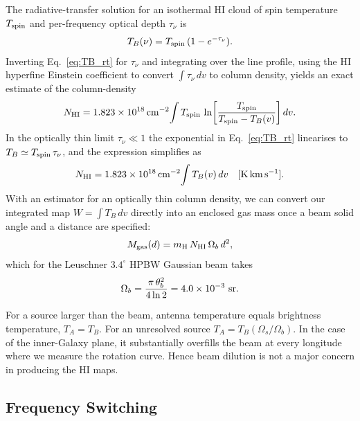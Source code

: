 \documentclass[10pt,preprint2]{aastex}
\begin{document}
The radiative-transfer solution for an isothermal HI cloud of spin temperature $T_{\rm spin}$ and per-frequency optical depth $\tau_\nu$ is
\begin{equation}
T_B(\nu) = T_{\rm spin}\,(1 - e^{-\tau_\nu}).
\label{eq:TB_rt}
\end{equation}
Inverting Eq.~\eqref{eq:TB_rt} for $\tau_\nu$ and integrating over the line profile, using the HI hyperfine Einstein coefficient to convert $\int \tau_\nu\,dv$ to column density, yields an exact estimate of the column-density
\begin{equation}
N_{\rm HI} = 1.823\times 10^{18}\,\mathrm{cm^{-2}}\!\int T_{\rm spin}\,\ln\!\left[\frac{T_{\rm spin}}{T_{\rm spin} - T_B(v)}\right] dv.
\label{eq:nh_thick}
\end{equation}
In the optically thin limit $\tau_\nu \ll 1$ the exponential in Eq.~\eqref{eq:TB_rt} linearises to $T_B \simeq T_{\rm spin}\,\tau_\nu$, and the expression simplifies as
\begin{equation}
N_{\rm HI} = 1.823 \times 10^{18}\,\mathrm{cm^{-2}}\!\int T_B(v)\,dv \quad [\mathrm{K\,km\,s^{-1}}].
\label{eq:nh_to_TB}
\end{equation}
With an estimator for an optically thin column density, we can convert our integrated map $W = \int T_B\,dv$ directly into an enclosed gas mass once a beam solid angle and a distance are specified:
\begin{equation}
M_{\rm gas}(d) = m_{\rm H}\,N_{\rm HI}\,\Omega_b\,d^2,
\label{eq:Mgas}
\end{equation}
which for the Leuschner $3.4^\circ$ HPBW Gaussian beam takes
\begin{equation}
\Omega_b = \frac{\pi\,\theta_b^2}{4\ln 2} = 4.0 \times 10^{-3}~{\rm sr}.
\label{eq:Omega_b}
\end{equation}

For a source larger than the beam, antenna temperature equals brightness temperature, $T_A = T_B$. For an unresolved source $T_A = T_B(\Omega_s / \Omega_b)$. In the case of the inner-Galaxy plane, it substantially overfills the beam at every longitude where we measure the rotation curve. Hence beam dilution is not a major concern in producing the HI maps.

\subsection{Frequency Switching}
\label{sec:theory_yfactor}
\end{document}

